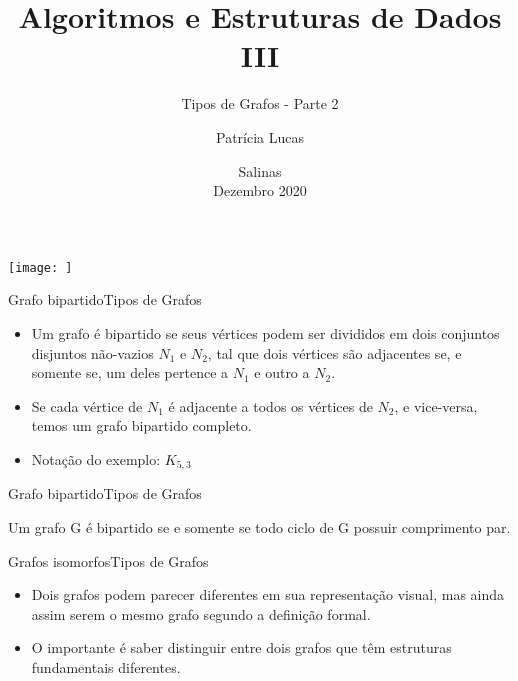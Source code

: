 \documentclass[t]{beamer}
\title[]{Algoritmos e Estruturas de Dados III}
\subtitle[]{Tipos de Grafos - Parte 2}
\author[]{Patrícia Lucas\\{\footnotesize }}
\institute{Bacharelado em Sistemas de Informação \\ IFNMG  - Campus Salinas}
\date{\scriptsize Salinas\\Dezembro 2020}
\begin{document}
\begin{frame}

\begin{center}
\texttt{[image: ]}
\end{center}
  \titlepage
\end{frame}

\begin{ftst}{Grafo bipartido}{Tipos de Grafos}

\begin{itemize}
    \item Um grafo é bipartido se seus vértices podem ser divididos em dois conjuntos disjuntos não-vazios $N_1$ e $N_2$, tal que dois vértices são adjacentes se, e somente se, um deles pertence a $N_1$ e outro a $N_2$.
    \item Se cada vértice de $N_1$ é adjacente a todos os vértices de $N_2$, e vice-versa, temos um grafo bipartido completo. 
    \item Notação do exemplo: $K_{5,3}$
\end{itemize}
\vone
\centering


\end{ftst}


\begin{ftst}{Grafo bipartido}{Tipos de Grafos}

Um grafo G é bipartido se e somente se todo ciclo de G possuir comprimento par.
\vone

\centering 

\end{ftst}


\begin{ftst}{Grafos isomorfos}{Tipos de Grafos}
\begin{itemize}
    \item Dois grafos podem parecer diferentes em sua representação visual, mas ainda assim serem o mesmo grafo segundo a definição formal.\\
    \item O importante é saber distinguir entre dois grafos que têm estruturas fundamentais diferentes.
\end{itemize}

\vone
\centering



\end{ftst}
\end{document}
